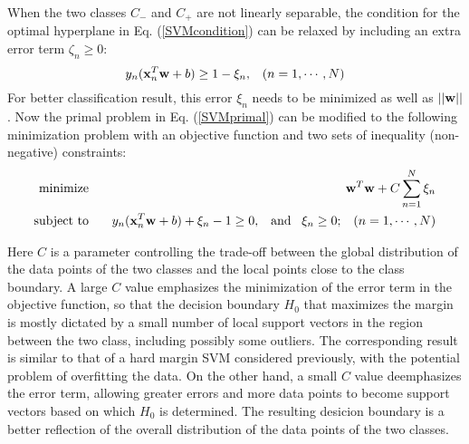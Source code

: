 \documentclass{article}
\begin{document}
When the two classes $C_-$ and $C_+$ are not linearly separable, the 
condition for the optimal hyperplane in Eq. (\ref{SVMcondition}) can 
be relaxed by including an extra error term $\zeta_n \ge 0$:
\begin{equation}
  y_n ({\bf x}_n^T{\bf w} +b) \ge 1-\xi_n,\;\;\;(n=1,\cdots,N)	
\end{equation}
For better classification result, this error $\xi_n$ needs to be 
minimized as well as $||{\bf w}||$. Now the primal problem in 
Eq. (\ref{SVMprimal}) can be modified to the following minimization 
problem with an objective function and two sets of inequality 
(non-negative) constraints:
\begin{eqnarray}
  \mbox{minimize} \;\;\; && {\bf w}^T {\bf w}+C\sum_{n=1}^N \xi_n
  \nonumber \\
  \mbox{subject to} \;\;\; && y_n ({\bf x}_n^T {\bf w}+b)+\xi_n-1 \ge 0,
  \;\;\;\mbox{and}\;\;\;\xi_n \ge 0;\;\;\;(n=1,\cdots,N)
\end{eqnarray}

Here $C$ is a parameter controlling the trade-off between the global 
distribution of the data points of the two classes and the local 
points close to the class boundary. A large $C$ value emphasizes the
minimization of the error term in the objective function, so that the 
decision boundary $H_0$ that maximizes the margin is mostly dictated 
by a small number of local support vectors in the region between the 
two class, including possibly some outliers. The corresponding result 
is similar to that of a hard margin SVM considered previously, with 
the potential problem of overfitting the data. On the other hand, a 
small $C$ value deemphasizes the error term, allowing greater errors
and more data points to become support vectors based on which $H_0$
is determined. The resulting desicion boundary is a better reflection
of the overall distribution of the data points of the two classes. 
\end{document}

